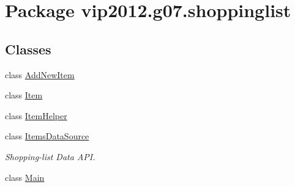 \hypertarget{namespacevip2012_1_1g07_1_1shoppinglist}{\section{Package vip2012.\-g07.\-shoppinglist}
\label{namespacevip2012_1_1g07_1_1shoppinglist}
}
\subsection*{Classes}
\begin{DoxyCompactItemize}
\item 
class \hyperlink{classvip2012_1_1g07_1_1shoppinglist_1_1AddNewItem}{Add\-New\-Item}
\item 
class \hyperlink{classvip2012_1_1g07_1_1shoppinglist_1_1Item}{Item}
\item 
class \hyperlink{classvip2012_1_1g07_1_1shoppinglist_1_1ItemHelper}{Item\-Helper}
\item 
class \hyperlink{classvip2012_1_1g07_1_1shoppinglist_1_1ItemsDataSource}{Items\-Data\-Source}
\begin{DoxyCompactList}\small\item\em Shopping-\/list Data A\-P\-I. \end{DoxyCompactList}\item 
class \hyperlink{classvip2012_1_1g07_1_1shoppinglist_1_1Main}{Main}
\end{DoxyCompactItemize}

